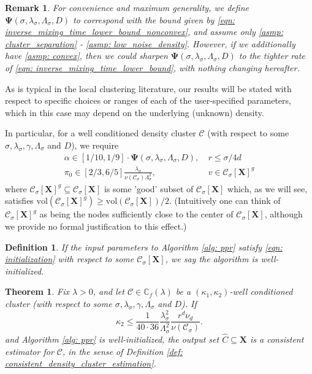 \documentclass{article}
\newcommand{\vol}{\mathrm{vol}}
\newcommand{\1}{\mathbf{1}}
\newcommand{\Xbf}{\mathbf{X}}
\newcommand{\Cbb}{\mathbb{C}}
\newcommand{\Cset}{\mathcal{C}}
\newcommand{\Csig}{\Cset_{\sigma}}
\theoremstyle{aldenthm}
\newtheorem{theorem}{Theorem}
\newtheorem{definition}{Definition}
\theoremstyle{aldenrmrk}
\newtheorem{remark}{Remark}
\begin{document}
\begin{remark}
	For convenience and maximum generality, we define $\mathbf{\Psi}(\sigma, \lambda_{\sigma}, \Lambda_{\sigma}, D)$ to correspond with the bound given by \eqref{eqn: inverse_mixing_time_lower_bound_nonconvex}, and assume only \ref{asmp: cluster_separation} - \ref{asmp: low_noise_density}. However, if we additionally have \ref{asmp: convex}, then we could sharpen $\mathbf{\Psi}(\sigma, \lambda_{\sigma}, \Lambda_{\sigma}, D)$ to the tighter rate of \eqref{eqn: inverse_mixing_time_lower_bound}, with nothing changing hereafter. 
\end{remark}

As is typical in the local clustering literature, our results will be stated with respect to specific choices or ranges of each of the user-specified parameters, which in this case may depend on the underlying (unknown) density. 

In particular, for a well conditioned density cluster $\Cset$ (with respect to some $\sigma, \lambda_{\sigma}, \gamma, \Lambda_{\sigma}$ and $D$), we require
\begin{align}
\label{eqn: initialization}
\alpha \in [1/10, 1/9] \cdot \mathbf{\Psi}(\sigma, \lambda_{\sigma}, \Lambda_{\sigma}, D), & ~r \leq \sigma/4d  \nonumber \\
\pi_0 \in [2/3, 6/5] \frac{\lambda_{\sigma}}{\nu(\Csig) \Lambda_{\sigma}^2}, & ~v \in \Csig[\Xbf]^g
\end{align}
where $\Csig[\Xbf]^g \subseteq \Csig[\Xbf]$ is some 'good' subset of $\Csig[\Xbf]$ which, as we will see, satisfies $\vol(\Csig[\Xbf]^g) \geq \vol(\Csig[\Xbf])/2$. (Intuitively one can think of $\Csig[\Xbf]^g$ as being the nodes sufficiently close to the center of $\Csig[\Xbf]$, although we provide no formal justification to this effect.)

\begin{definition}
	If the input parameters to Algorithm \ref{alg: ppr} satisfy \ref{eqn: initialization} with respect to some $\Csig[\Xbf]$, we say the algorithm is  \emph{well-initialized}.
\end{definition}

\begin{theorem}
	\label{thm: consistent_recovery_of_density_clusters}
	Fix $\lambda > 0$, and let $\Cset \in \Cbb_f(\lambda)$ be a $(\kappa_1,\kappa_2)$-well conditioned cluster (with respect to some $\sigma, \lambda_{\sigma}, \gamma, \Lambda_{\sigma}$ and $D$). If
	\begin{equation}
	\label{eqn: kappa2_ub}
	\kappa_2 \leq \frac{1}{40 \cdot 36} \frac{\lambda_{\sigma}^2}{\Lambda_{\sigma}^2} \frac{r^d \nu_d}{\nu(\Csig)}.
	\end{equation}
	and Algorithm \ref{alg: ppr} is well-initialized, the output set $\widehat{C} \subseteq \Xbf$ is a consistent estimator for $\Cset$, in the sense of Definition \ref{def: consistent_density_cluster_estimation}.
\end{theorem}
\end{document}
